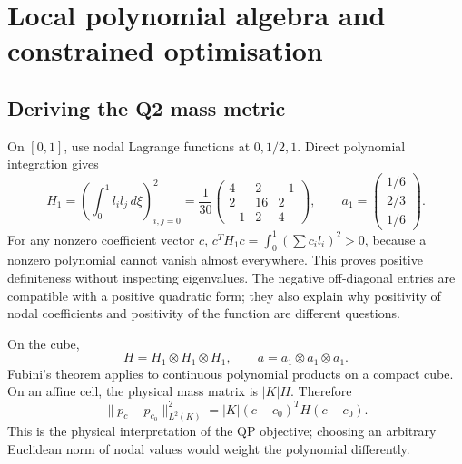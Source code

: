 \chapter{Local polynomial algebra and constrained optimisation}\label{app:local-algebra}
\section{Deriving the Q2 mass metric}
On $[0,1]$, use nodal Lagrange functions at $0,1/2,1$. Direct polynomial integration gives
\begin{equation}
 H_1=\left(\int_0^1l_i l_j\,d\xi\right)_{i,j=0}^{2}
 =\frac1{30}\begin{pmatrix}4&2&-1\\2&16&2\\-1&2&4\end{pmatrix},
 \qquad a_1=\begin{pmatrix}1/6\\2/3\\1/6\end{pmatrix}.
\end{equation}
For any nonzero coefficient vector $c$, $c^TH_1c=\int_0^1(\sum c_il_i)^2>0$, because a nonzero polynomial cannot vanish almost everywhere. This proves positive definiteness without inspecting eigenvalues. The negative off-diagonal entries are compatible with a positive quadratic form; they also explain why positivity of nodal coefficients and positivity of the function are different questions.

On the cube,
\begin{equation}
 H=H_1\otimes H_1\otimes H_1,\qquad
 a=a_1\otimes a_1\otimes a_1.
\end{equation}
Fubini's theorem applies to continuous polynomial products on a compact cube. On an affine cell, the physical mass matrix is $|K|H$. Therefore
\begin{equation}
 \|p_c-p_{c_0}\|_{L^2(K)}^2=|K|(c-c_0)^TH(c-c_0).
\end{equation}
This is the physical interpretation of the QP objective; choosing an arbitrary Euclidean norm of nodal values would weight the polynomial differently.


